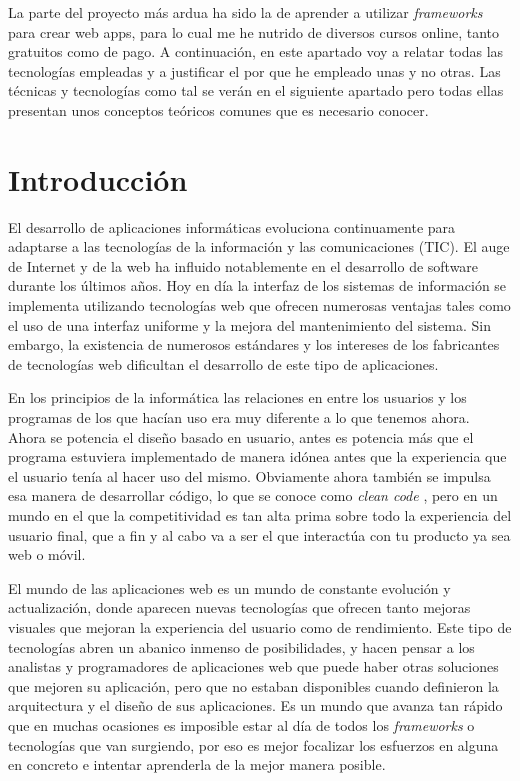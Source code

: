 
La parte del proyecto más ardua ha sido la de aprender a utilizar \emph{frameworks}  para crear web apps, para lo cual me he nutrido de diversos cursos online, tanto gratuitos como de pago. A continuación, en este apartado voy a relatar todas las tecnologías empleadas y a justificar el por que he empleado unas y no otras. Las técnicas y tecnologías como tal se verán en el siguiente apartado pero todas ellas presentan unos conceptos teóricos comunes que es necesario conocer. 


\section{Introducción}\label{teorico-introduccion}
El desarrollo de aplicaciones informáticas evoluciona continuamente para adaptarse a las tecnologías de la información y las comunicaciones (TIC). El auge de Internet y de la web ha influido notablemente en el desarrollo de software durante los últimos años. Hoy en día la interfaz de los sistemas de información se implementa utilizando tecnologías web que ofrecen numerosas ventajas tales como el uso de una interfaz uniforme y la mejora del mantenimiento del sistema. Sin embargo, la existencia de numerosos estándares y los intereses de los fabricantes de tecnologías web dificultan el desarrollo de este tipo de aplicaciones. 

En los principios de la informática las relaciones en entre los usuarios y los programas de los que hacían uso era muy diferente a lo que tenemos ahora. Ahora se potencia el diseño basado en usuario, antes es potencia más que el programa estuviera implementado de manera idónea antes que la experiencia que el usuario tenía al hacer uso del mismo. Obviamente ahora también se impulsa esa manera de desarrollar código, lo que se conoce como \emph{clean code} \cite{https://g.co/kgs/VLR4mn}, pero en un mundo en el que la competitividad es tan alta prima sobre todo la experiencia del usuario final, que a fin y al cabo va a ser el que interactúa con tu producto ya sea web o móvil. 



El mundo de las aplicaciones web es un mundo de constante evolución y actualización, donde aparecen nuevas tecnologías que ofrecen tanto mejoras visuales que mejoran la experiencia del usuario como de rendimiento. Este tipo de tecnologías abren un abanico inmenso de posibilidades, y hacen pensar a los analistas y programadores de aplicaciones web que puede haber otras soluciones que mejoren su aplicación, pero que no estaban disponibles cuando definieron la arquitectura y el diseño de sus aplicaciones. Es un mundo que avanza tan rápido que en muchas ocasiones es imposible estar al día de todos los  \emph{frameworks} o tecnologías que van surgiendo, por eso es mejor focalizar los esfuerzos en alguna en concreto e intentar aprenderla de la mejor manera posible. 




